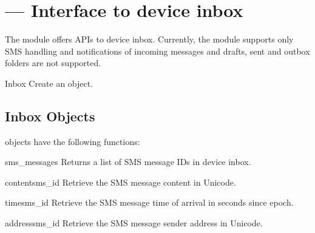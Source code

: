 %
%
%

\section{ ---
   Interface to device inbox}
\label{sec:inbox}


The  module offers APIs to device inbox. Currently, the 
 module supports only SMS handling and notifications of 
incoming messages and drafts, sent and outbox folders are not supported.

\begin{classdesc}{Inbox}{}
Create an  object.
\end{classdesc}

\subsection{Inbox Objects}
\label{subsec:inbox}

 objects have the following functions:

\begin{methoddesc}[Inbox]{sms_messages}{}
Returns a list of SMS message IDs in device inbox.
\end{methoddesc}

\begin{methoddesc}[Inbox]{content}{sms_id}
Retrieve the SMS message content in Unicode. 
\end{methoddesc}

\begin{methoddesc}[Inbox]{time}{sms_id}
Retrieve the SMS message time of arrival in seconds since epoch. 
\end{methoddesc}

\begin{methoddesc}[Inbox]{address}{sms_id}
Retrieve the SMS message sender address in Unicode. 
\end{methoddesc}

